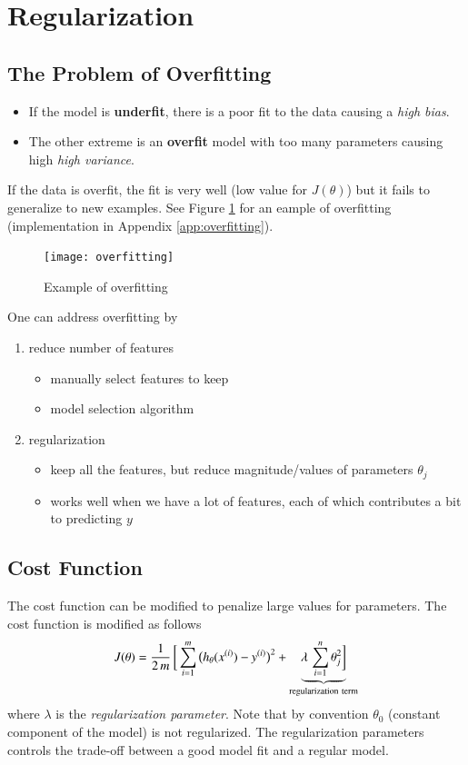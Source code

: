 \documentclass[a4paper,twoside,10pt]{article}
\begin{document}
\section{Regularization}
\subsection{The Problem of Overfitting}
\begin{itemize}
  \item If the model is \textbf{underfit}, there is a poor fit to the data causing a \emph{high bias}.
  \item The other extreme is an \textbf{overfit} model with too many parameters causing high \emph{high variance}.
\end{itemize}
If the data is overfit, the fit is very well (low value for $J(\theta)$) but it fails to generalize to new examples.
See Figure \ref{fig:overfitting} for an eample of overfitting (implementation in Appendix \ref{app:overfitting}).
\begin{figure}[htbp]
  \begin{center}
    \texttt{[image: overfitting]}
    \caption{Example of overfitting\label{fig:overfitting}}
  \end{center}
\end{figure}

One can address overfitting by
\begin{enumerate}
  \item reduce number of features
    \begin{itemize}
      \item manually select features to keep
      \item model selection algorithm
    \end{itemize}
  \item regularization
    \begin{itemize}
      \item keep all the features, but reduce magnitude/values of parameters $\theta_j$
      \item works well when we have a lot of features, each of which contributes a bit to predicting $y$
    \end{itemize}
\end{enumerate}

\subsection{Cost Function}
The cost function can be modified to penalize large values for parameters.
The cost function is modified as follows
\begin{equation*}
  J(\theta)=\frac{1}{2\,m}\,\bigg[\sumi\big(h_\theta(\sxi)-\syi\big)^2+\underbrace{\lambda\,\sum_{i=1}^n\theta_j^2\bigg]}_{\mathrm{regularization\ term}}
\end{equation*}
where $\lambda$ is the \emph{regularization parameter}.
Note that by convention $\theta_0$ (constant component of the model) is not regularized.
The regularization parameters controls the trade-off between a good model fit and a regular model.
\end{document}
